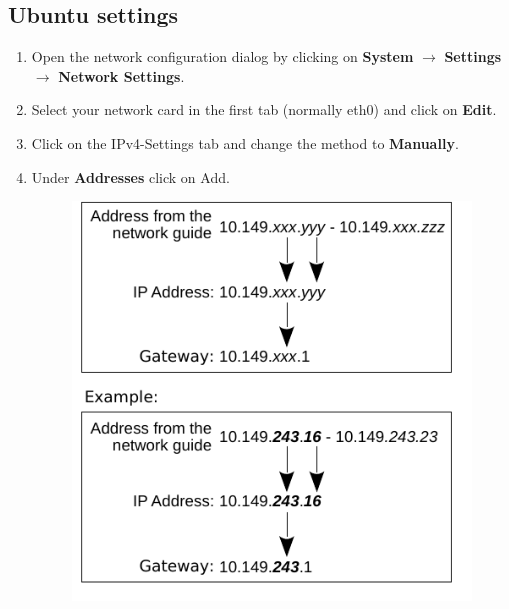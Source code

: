 \documentclass[a4paper,12pt]{scrartcl}
\newcommand{\optemph}[1]{\textbf{#1}}
\begin{document}
\subsection*{Ubuntu settings}
\begin{enumerate}
	\item Open the network configuration dialog by clicking on \optemph{System} $\rightarrow$ \optemph{Settings} $\rightarrow$ \optemph{Network Settings}.
	\item Select your network card in the first tab (normally eth0) and click on \optemph{Edit}.
	\item Click on the IPv4-Settings tab and change the method to \optemph{Manually}.
	\item Under \optemph{Addresses} click on Add.
      \begin{figure}[h!]
        \centering
        \begin{minipage}[c]{0.45\linewidth}
          \centering
          \includegraphics[width=\linewidth,keepaspectratio]{Bilder/IP_Gerneric_EN_mb}
        \end{minipage}
        \begin{minipage}[c]{0.5\linewidth}
          \centering

\end{minipage}
\end{figure}
\end{enumerate}
\end{document}
